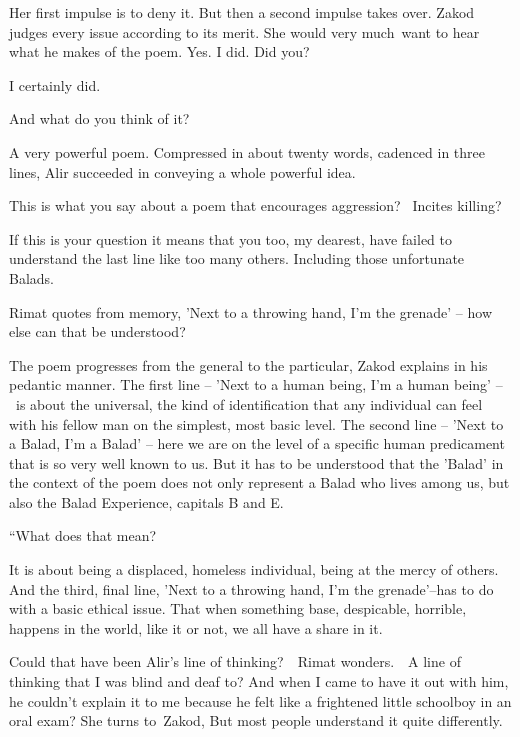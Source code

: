 \documentclass[twoside,11pt]{book}
\begin{document}
Her first impulse is to deny it. But then a second impulse takes over. Zakod judges every issue according to its merit.
She would very much\ want to hear what he makes of the poem. {\textquotedbl}Yes. I did. Did you?{\textquotedbl}

{\textquotedbl}I certainly did.{\textquotedbl}

{\textquotedbl}And what do you think of it?{\textquotedbl} 

{\textquotedbl}A very powerful poem. Compressed in about twenty words, cadenced in three lines, Alir succeeded in
conveying a whole powerful idea.{\textquotedbl}~ 

{\textquotedbl}This is what you say about a poem that encourages aggression? ~Incites killing?{\textquotedbl} 

{\textquotedbl}If this is your question it means that you too, my dearest, have failed to understand the last line like
too many others. Including those unfortunate Balads.{\textquotedbl} 

Rimat quotes from memory, {\textquotedbl}{}'Next to a throwing hand, I'm the grenade' -- how else can that be
understood?{\textquotedbl} 

{\textquotedbl}The poem progresses from the general to the particular,{\textquotedbl} Zakod explains in his pedantic
manner. {\textquotedbl}The first line -- 'Next to a human being, I'm a human being' --~is about the universal, the kind
of identification that any individual can feel with his fellow man on the simplest, most basic level. The second line
-- 'Next to a Balad, I'm a Balad{}' -- here we are on the level of a specific human predicament that is so very well
known to us. But it has to be understood that the 'Balad{}' in the context of the poem does not only represent a Balad
who lives among us, but also the Balad Experience, capitals B and E.{\textquotedbl}{\ }

{}``What does that mean?{\textquotedbl} 

{\textquotedbl}It is about being a displaced, homeless individual, being at the mercy of others. And the third, final
line, 'Next to a throwing hand, I'm the grenade'--has to do with a basic ethical issue. That when something base,
despicable, horrible, happens in the world, like it or not, we all have a share in
it.{\textquotedbl}{\ }

Could that have been Alir's line of thinking?\ \ Rimat wonders.\ \ A line of thinking that I was blind and deaf to? And
when I came to have it out with him, he couldn't explain it to me because he felt like a frightened little schoolboy in
an oral exam? She turns to{\ }Zakod, {\textquotedbl}But most people understand
it quite differently.{\textquotedbl} 
\end{document}
